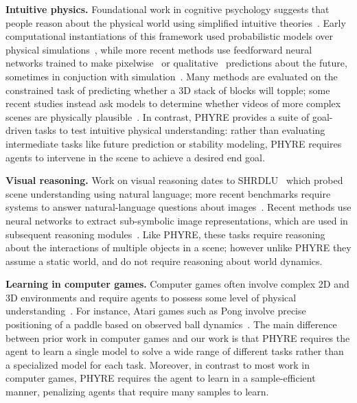 \documentclass{article}
\begin{document}
\noindent\textbf{Intuitive physics.} Foundational work in cognitive psychology suggests that people reason about the physical world using simplified intuitive theories~\cite{mccloskey1983naive,mccloskey1980curvilinear,mccloskey1983intuitive}. Early computational instantiations of this framework used probabilistic models over physical simulations~\cite{battaglia2013simulation,zhang2016evaluation}, while more recent methods use feedforward neural networks trained to make pixelwise~\cite{finn2016unsupervised,lerer2016blocks,mirza2017generalizable,xue2016visual} or qualitative~\cite{groth2018shapestacks,li2016fall,li2017stability,mirza2017generalizable,zhang2016evaluation} predictions about the future, sometimes in conjuction with simulation~\cite{janner2019,wu2015galileo,wu2017learning}. Many methods are evaluated on the constrained task of predicting whether a 3D stack of blocks will topple; some recent studies instead ask models to determine whether videos of more complex scenes are physically plausible~\cite{piloto2018probing,riochet2018intphys}. In contrast, PHYRE provides a suite of goal-driven tasks to test intuitive physical understanding: rather than evaluating intermediate tasks like future prediction or stability modeling, PHYRE requires agents to intervene in the scene to achieve a desired end goal.

\noindent\textbf{Visual reasoning.} Work on visual reasoning dates to SHRDLU~\cite{winograd1971} which probed scene understanding using natural language; more recent benchmarks require systems to answer natural-language questions about images~\cite{antol2015vqa,johnson2017clevr}. Recent methods use neural networks to extract sub-symbolic image representations, which are used in subsequent reasoning modules~\cite{hu2017learning,hudson2018compositional,johnson2017inferring,mao2019neurosymbolic,perez2018film,santoro2017relational}. Like PHYRE, these tasks require reasoning about the interactions of multiple objects in a scene; however unlike PHYRE they assume a static world, and do not require reasoning about world dynamics.

\noindent\textbf{Learning in computer games.} Computer games often involve complex 2D and 3D environments and require agents to possess some level of physical understanding~\cite{mnih2015atari,smith2006billiards}. For instance, Atari games such as Pong involve precise positioning of a paddle based on observed ball dynamics~\cite{mnih2015atari}. The main difference between prior work in computer games and our work is that PHYRE requires the agent to learn a single model to solve a wide range of different tasks rather than a specialized model for each task. Moreover, in contrast to most work in computer games, PHYRE requires the agent to learn in a sample-efficient manner, penalizing agents that require many samples to learn.
\end{document}

